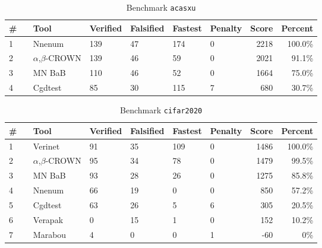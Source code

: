 

\begin{table}[h]
\begin{center}
\caption{Benchmark \texttt{acasxu}} \label{tab:cat_{cat}}
{\setlength{\tabcolsep}{2pt}
\begin{tabular}[h]{@{}llllllrr@{}}
\toprule
\textbf{\# ~} & \textbf{Tool} & \textbf{Verified} & \textbf{Falsified} & \textbf{Fastest} & \textbf{Penalty} & \textbf{Score} & \textbf{Percent}\\
\midrule
1 & Nnenum & 139 & 47 & 174 & 0 & 2218 & 100.0\% \\
2 & $\alpha$,$\beta$-CROWN & 139 & 46 & 59 & 0 & 2021 & 91.1\% \\
3 & MN BaB & 110 & 46 & 52 & 0 & 1664 & 75.0\% \\
4 & Cgdtest & 85 & 30 & 115 & 7 & 680 & 30.7\% \\
\bottomrule
\end{tabular}
}
\end{center}
\end{table}




\begin{table}[h]
\begin{center}
\caption{Benchmark \texttt{cifar2020}} \label{tab:cat_{cat}}
{\setlength{\tabcolsep}{2pt}
\begin{tabular}[h]{@{}llllllrr@{}}
\toprule
\textbf{\# ~} & \textbf{Tool} & \textbf{Verified} & \textbf{Falsified} & \textbf{Fastest} & \textbf{Penalty} & \textbf{Score} & \textbf{Percent}\\
\midrule
1 & Verinet & 91 & 35 & 109 & 0 & 1486 & 100.0\% \\
2 & $\alpha$,$\beta$-CROWN & 95 & 34 & 78 & 0 & 1479 & 99.5\% \\
3 & MN BaB & 93 & 28 & 26 & 0 & 1275 & 85.8\% \\
4 & Nnenum & 66 & 19 & 0 & 0 & 850 & 57.2\% \\
5 & Cgdtest & 63 & 26 & 5 & 6 & 305 & 20.5\% \\
6 & Verapak & 0 & 15 & 1 & 0 & 152 & 10.2\% \\
7 & Marabou & 4 & 0 & 0 & 1 & -60 & 0\% \\
\bottomrule
\end{tabular}
}
\end{center}
\end{table}


